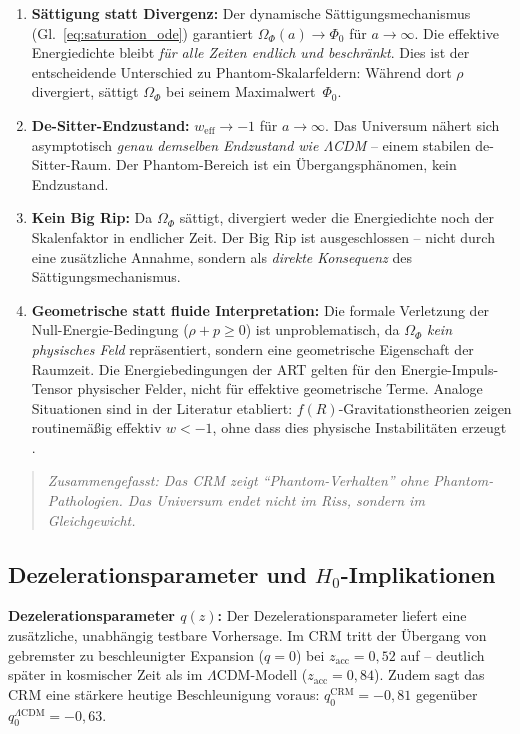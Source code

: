 \documentclass[aps,prd,twocolumn,superscriptaddress,nofootinbib]{revtex4-2}
\begin{document}
\begin{enumerate}
\item \textbf{S\"attigung statt Divergenz:} Der dynamische S\"attigungsmechanismus (Gl.~\ref{eq:saturation_ode}) garantiert $\Omega_\Phi(a) \to \Phi_0$ f\"ur $a \to \infty$. Die effektive Energiedichte bleibt \textit{f\"ur alle Zeiten endlich und beschr\"ankt}. Dies ist der entscheidende Unterschied zu Phantom-Skalarfeldern: W\"ahrend dort $\rho$ divergiert, s\"attigt $\Omega_\Phi$ bei seinem Maximalwert~$\Phi_0$.
\item \textbf{De-Sitter-Endzustand:} $w_{\mathrm{eff}} \to -1$ f\"ur $a \to \infty$. Das Universum n\"ahert sich asymptotisch \textit{genau demselben Endzustand wie $\Lambda$CDM} -- einem stabilen de-Sitter-Raum. Der Phantom-Bereich ist ein \"Ubergangsph\"anomen, kein Endzustand.
\item \textbf{Kein Big Rip:} Da $\Omega_\Phi$ s\"attigt, divergiert weder die Energiedichte noch der Skalenfaktor in endlicher Zeit. Der Big Rip ist ausgeschlossen -- nicht durch eine zus\"atzliche Annahme, sondern als \textit{direkte Konsequenz} des S\"attigungsmechanismus.
\item \textbf{Geometrische statt fluide Interpretation:} Die formale Verletzung der Null-Energie-Bedingung ($\rho + p \geq 0$) ist unproblematisch, da $\Omega_\Phi$ \textit{kein physisches Feld} repr\"asentiert, sondern eine geometrische Eigenschaft der Raumzeit. Die Energiebedingungen der ART gelten f\"ur den Energie-Impuls-Tensor physischer Felder, nicht f\"ur effektive geometrische Terme. Analoge Situationen sind in der Literatur etabliert: $f(R)$-Gravitationstheorien zeigen routinem\"a\ss{}ig effektiv $w < -1$, ohne dass dies physische Instabilit\"aten erzeugt \cite{Sotiriou2010}.
\end{enumerate}

\begin{quote}
\textit{Zusammengefasst: Das CRM zeigt ``Phantom-Verhalten'' ohne Phantom-Pathologien. Das Universum endet nicht im Riss, sondern im Gleichgewicht.}
\end{quote}

\subsection{Dezelerationsparameter und $H_0$-Implikationen}
\label{subsec:dezeleration}

\textbf{Dezelerationsparameter $q(z)$:} Der Dezelerationsparameter liefert eine zus\"atzliche, unabh\"angig testbare Vorhersage. Im CRM tritt der \"Ubergang von gebremster zu beschleunigter Expansion ($q = 0$) bei $z_{\mathrm{acc}} = 0{,}52$ auf -- deutlich sp\"ater in kosmischer Zeit als im $\Lambda$CDM-Modell ($z_{\mathrm{acc}} = 0{,}84$). Zudem sagt das CRM eine st\"arkere heutige Beschleunigung voraus: $q_0^{\mathrm{CRM}} = -0{,}81$ gegen\"uber $q_0^{\Lambda\mathrm{CDM}} = -0{,}63$.
\end{document}
